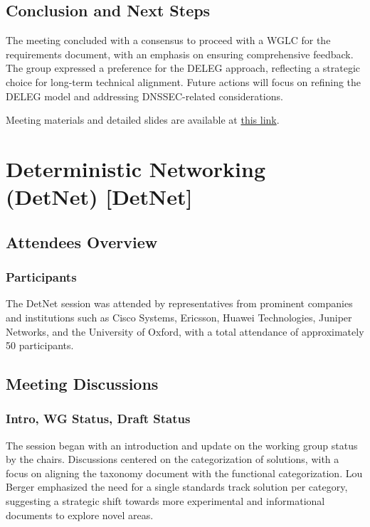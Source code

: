 \documentclass{article}
\begin{document}
\subsection{Conclusion and Next Steps}
The meeting concluded with a consensus to proceed with a WGLC for the requirements document, with an emphasis on ensuring comprehensive feedback. The group expressed a preference for the DELEG approach, reflecting a strategic choice for long-term technical alignment. Future actions will focus on refining the DELEG model and addressing DNSSEC-related considerations.

Meeting materials and detailed slides are available at \href{https://datatracker.ietf.org/meeting/121/materials/slides-121-deleg-comparison-draft-wesplaap-deleg-01-vs-draft-homburg-deleg-incremental-deleg-00-00}{this link}.



\newpage

\section{Deterministic Networking (DetNet) [DetNet]}

\subsection{Attendees Overview}
\subsubsection{Participants}
The DetNet session was attended by representatives from prominent companies and institutions such as Cisco Systems, Ericsson, Huawei Technologies, Juniper Networks, and the University of Oxford, with a total attendance of approximately 50 participants.

\subsection{Meeting Discussions}

\subsubsection{Intro, WG Status, Draft Status}
The session began with an introduction and update on the working group status by the chairs. Discussions centered on the categorization of solutions, with a focus on aligning the taxonomy document with the functional categorization. Lou Berger emphasized the need for a single standards track solution per category, suggesting a strategic shift towards more experimental and informational documents to explore novel areas.
\end{document}
